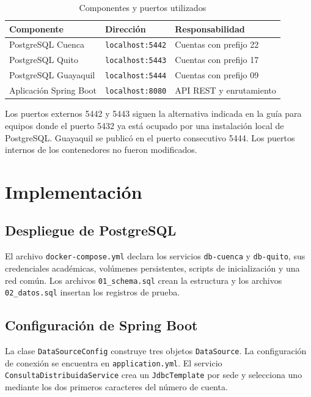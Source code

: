 \documentclass[12pt,a4paper]{article}
\begin{document}
\begin{table}[H]
  \centering
  \caption{Componentes y puertos utilizados}
  \begin{tabular}{>{\raggedright\arraybackslash}p{4cm}p{4cm}p{5cm}}
    \toprule
    Componente & Dirección & Responsabilidad \\
    \midrule
    PostgreSQL Cuenca & \texttt{localhost:5442} & Cuentas con prefijo 22 \\
    PostgreSQL Quito & \texttt{localhost:5443} & Cuentas con prefijo 17 \\
    PostgreSQL Guayaquil & \texttt{localhost:5444} & Cuentas con prefijo 09 \\
    Aplicación Spring Boot & \texttt{localhost:8080} & API REST y enrutamiento \\
    \bottomrule
  \end{tabular}
\end{table}

Los puertos externos 5442 y 5443 siguen la alternativa indicada en la guía para equipos donde el puerto 5432 ya está ocupado por una instalación local de PostgreSQL. Guayaquil se publicó en el puerto consecutivo 5444. Los puertos internos de los contenedores no fueron modificados.

\section{Implementación}

\subsection{Despliegue de PostgreSQL}

El archivo \texttt{docker-compose.yml} declara los servicios \texttt{db-cuenca} y \texttt{db-quito}, sus credenciales académicas, volúmenes persistentes, scripts de inicialización y una red común. Los archivos \texttt{01\_schema.sql} crean la estructura y los archivos \texttt{02\_datos.sql} insertan los registros de prueba.

\subsection{Configuración de Spring Boot}

La clase \texttt{DataSourceConfig} construye tres objetos \texttt{DataSource}. La configuración de conexión se encuentra en \texttt{application.yml}. El servicio \texttt{ConsultaDistribuidaService} crea un \texttt{JdbcTemplate} por sede y selecciona uno mediante los dos primeros caracteres del número de cuenta.
\end{document}
